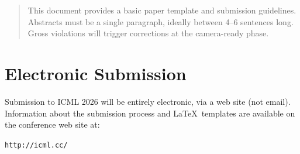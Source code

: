 \documentclass{article}
\theoremstyle{plain}
\theoremstyle{definition}
\theoremstyle{remark}
\begin{document}
\printAffiliationsAndNotice{}  %

\begin{abstract}
  This document provides a basic paper template and submission guidelines.
  Abstracts must be a single paragraph, ideally between 4--6 sentences long.
  Gross violations will trigger corrections at the camera-ready phase.
\end{abstract}

\section{Electronic Submission}

Submission to ICML 2026 will be entirely electronic, via a web site
(not email). Information about the submission process and \LaTeX\ templates
are available on the conference web site at:
\begin{center}
  \texttt{http://icml.cc/}
\end{center}
\end{document}
